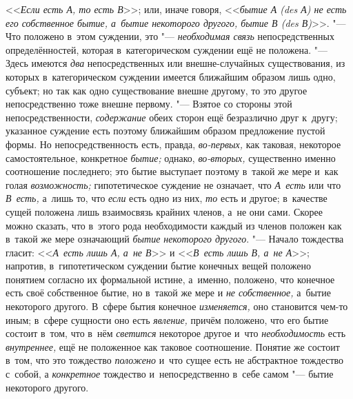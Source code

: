 <<{\em Если есть А, то есть В}>>; или, иначе говоря,
<<{\em бытие А (des А) не есть его
собственное бытие, а~бытие некоторого другого, бытие В (des В)}>>. "---
Что положено в~этом суждении, это "--- {\em необходимая связь}
непосредственных определённостей, которая в~категорическом
суждении ещё не положена. "--- Здесь имеются {\em два}
непосредственных или внешне-случайных существования, из
которых в~категорическом суждении имеется ближайшим образом лишь одно,
субъект; но так как одно существование внешне другому, то это другое
непосредственно тоже внешне первому. "--- Взятое со стороны
этой непосредственности, {\em содержание} обеих
сторон ещё безразлично друг к~другу; указанное суждение есть поэтому
ближайшим образом предложение пустой формы. Но непосредственность есть,
правда, {\em во-первых,} как таковая, некоторое самостоятельное, конкретное
{\em бытие;} однако, {\em во-вторых,}
существенно именно соотношение последнего; это бытие
выступает поэтому в~такой же мере и~как голая {\em возможность;}
гипотетическое суждение не означает, что {\em А~есть} или что
{\em В~есть,} а~лишь то, что {\em если} есть одно из них, {\em то} есть и
другое; в~качестве сущей положена лишь взаимосвязь крайних членов, а~не они
сами. Скорее можно сказать, что в~этого рода необходимости каждый из членов
положен как в~такой же мере означающий {\em бытие некоторого другого}. "---
Начало тождества гласит: <<{\em А~есть лишь А, а~не В}>> и <<{\em В~есть лишь
В, а~не А}>>; напротив, в~гипотетическом суждении бытие конечных
вещей положено понятием согласно их формальной истине, а~именно, положено,
что конечное есть своё собственное бытие, но в~такой же мере и
{\em не собственное,} а~бытие некоторого другого. В~сфере бытия конечное
{\em изменяется,} оно становится чем-то иным; в~сфере сущности оно есть
{\em явление,} причём положено, что его бытие состоит в~том, что в~нём
{\em светится} некоторое другое и~что {\em необходимость} есть
{\em внутреннее,} ещё не положенное как таковое соотношение. Понятие же
состоит в~том, что это тождество {\em положено}
и~что сущее есть не абстрактное тождество с~собой, а {\em конкретное}
тождество и~непосредственно в~себе самом "--- бытие некоторого другого.

